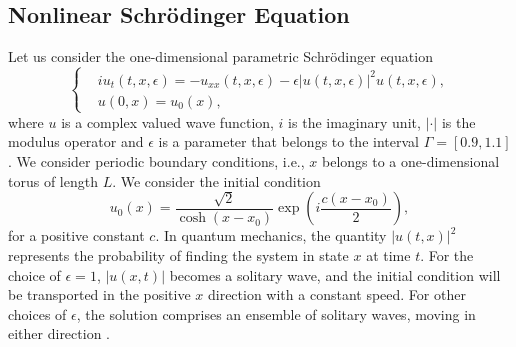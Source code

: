 \subsection{Nonlinear Schr\"odinger Equation} \label{chap:NuRe:1.2} Let us consider the one-dimensional parametric Schr\"odinger equation
\begin{equation} \label{eq:NuRe:10}
\left\{
\begin{aligned}
	& i u_t(t,x,\epsilon) = - u_{xx}(t,x,\epsilon) - \epsilon |u(t,x,\epsilon)|^2 u(t,x,\epsilon),\\
	& u(0,x) = u_0(x),
\end{aligned}
\right.
\end{equation}
where $u$ is a complex valued wave function, $i$ is the imaginary unit, $|\cdot|$ is the modulus operator and $\epsilon$ is a parameter that belongs to the interval $\Gamma = [0.9,1.1]$. We consider periodic boundary conditions, i.e., $x$ belongs to a one-dimensional torus of length $L$. We consider the initial condition
\begin{equation} \label{eq:NuRe:11}
	u_0(x) = \frac{\sqrt 2}{\cosh(x - x_0)} \exp(i\frac{c(x-x_0)}{2}),
\end{equation}
for a positive constant $c$. In quantum mechanics, the quantity $|u(t,x)|^2$ represents the probability of finding the system in state $x$ at time $t$. For the choice of $\epsilon = 1$, $|u(x,t)|$ becomes a solitary wave, and the initial condition will be transported in the positive $x$ direction with a constant speed. For other choices of $\epsilon$, the solution comprises an ensemble of solitary waves, moving in either direction \cite{faou2012geometric}. 

